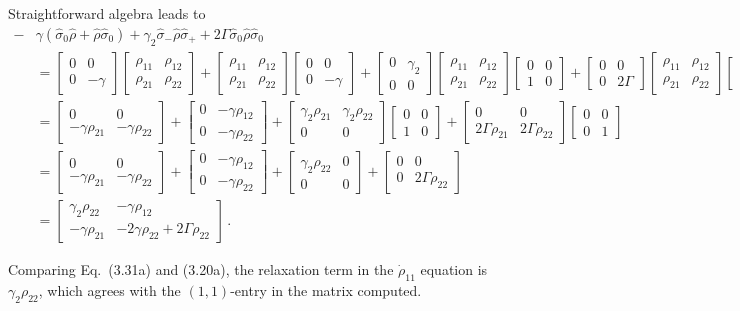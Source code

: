 \documentclass[11pt, oneside]{book}
\theoremstyle{break}
\theoremstyle{break}
\newcommand{\bmat}[1]{\begin{bmatrix} #1 \end{bmatrix}}
\begin{document}
\chapter{}
Straightforward algebra leads to
\begin{align*}
-&\gamma(\hat{\sigma}_0 \hat{\rho} + \hat{\rho}\hat{\sigma}_0)+ \gamma_2 \hat{\sigma}_- \hat{\rho} \hat{\sigma}_+ + 2\Gamma\hat{\sigma}_0 \hat{\rho} \hat{\sigma}_0\\
&=
\bmat{0 & 0 \\0 & -\gamma}\bmat{\rho_{11} & \rho_{12} \\ \rho_{21} & \rho_{22}}+\bmat{\rho_{11} & \rho_{12} \\ \rho_{21} & \rho_{22}}
\bmat{0 & 0 \\0 & -\gamma}+
\bmat{0 & \gamma_2 \\ 0 & 0}
\bmat{\rho_{11} & \rho_{12} \\ \rho_{21} & \rho_{22}}
\bmat{0 & 0 \\ 1 & 0}
+
\bmat{0 & 0 \\ 0 & 2\Gamma}
\bmat{\rho_{11} & \rho_{12} \\ \rho_{21} & \rho_{22}}
\bmat{0 & 0 \\ 0 & 1}\\
&= 
\bmat{0 & 0\\ -\gamma\rho_{21} & -\gamma\rho_{22}} + 
\bmat{0 & -\gamma \rho_{12} \\ 0 & -\gamma \rho_{22}} + 
\bmat{\gamma_2 \rho_{21} & \gamma_2 \rho_{22} \\ 0 & 0}\bmat{0 & 0 \\ 1 & 0} + 
\bmat{0 & 0 \\ 2\Gamma \rho_{21} & 2\Gamma\rho_{22}} \bmat{0 & 0 \\ 0 & 1}\\
&= \bmat{0 & 0\\ -\gamma\rho_{21} & -\gamma\rho_{22}} + 
\bmat{0 & -\gamma \rho_{12} \\ 0 & -\gamma \rho_{22}} + 
\bmat{\gamma_2 \rho_{22} & 0 \\ 0 & 0} + \bmat{0 & 0 \\ 0 & 2\Gamma\rho_{22}}\\
&= \bmat{\gamma_2 \rho_{22} & -\gamma \rho_{12} \\ -\gamma\rho_{21} & -2\gamma \rho_{22}+ 2\Gamma \rho_{22}}\,.
\end{align*}

Comparing Eq.\ (3.31a) and (3.20a), the relaxation term in the $\dot{\rho}_{11}$ equation is $\gamma_2 \rho_{22}$, which agrees with the $(1,1)$-entry in the matrix computed. \\
\end{document}
